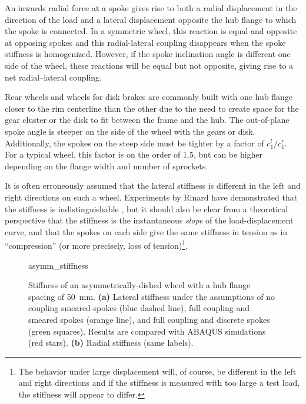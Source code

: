 \documentclass[\rootdir/thesis.tex]{subfiles}
\begin{document}
An inwards radial force at a spoke gives rise to both a radial displacement in the direction of the load and a lateral displacement opposite the hub flange to which the spoke is connected. In a symmetric wheel, this reaction is equal and opposite at opposing spokes and this radial-lateral coupling disappears when the spoke stiffness is homogenized. However, if the spoke inclination angle is different one side of the wheel, these reactions will be equal but not opposite, giving rise to a net radial--lateral coupling.

Rear wheels and wheels for disk brakes are commonly built with one hub flange closer to the rim centerline than the other due to the need to create space for the gear cluster or the disk to fit between the frame and the hub. The out-of-plane spoke angle is steeper on the side of the wheel with the gears or disk. Additionally, the spokes on the steep side must be tighter by a factor of $c_1^l/c_1^r$. For a typical wheel, this factor is on the order of 1.5, but can be higher depending on the flange width and number of sprockets.

It is often erroneously assumed that the lateral stiffness is different in the left and right directions on such a wheel. Experiments by Rinard have demonstrated that the stiffness is indistinguishable \cite{Rinard}, but it should also be clear from a theoretical perspective that the stiffness is the instantaneous \emph{slope} of the load-displacement curve, and that the spokes on each side give the same stiffness in tension as in ``compression'' (or more precisely, loss of tension)\footnote{The behavior under large displacement will, of course, be different in the left and right directions and if the stiffness is measured with too large a test load, the stiffness will appear to differ.}.

\begin{figure}[t]
\centering
{asymm_stiffness}
\caption{Stiffness of an asymmetrically-dished wheel with a hub flange spacing of \SI{50}{mm}. \textbf{(a)} Lateral stiffness under the assumptions of no coupling smeared-spokes (blue dashed line), full coupling and smeared spokes (orange line), and full coupling and discrete spokes (green squares). Results are compared with ABAQUS simulations (red stars). \textbf{(b)} Radial stiffness (same labels).}
\label{fig:asymm_wheel}
\end{figure}
\end{document}

